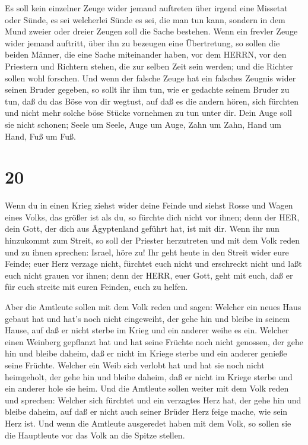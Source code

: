  Es soll kein einzelner Zeuge wider jemand auftreten über
irgend eine Missetat oder Sünde, es sei welcherlei Sünde es sei, die man
tun kann, sondern in dem Mund zweier oder dreier Zeugen soll die Sache
bestehen.  Wenn ein frevler Zeuge wider jemand auftritt,
über ihn zu bezeugen eine Übertretung,  so sollen die
beiden Männer, die eine Sache miteinander haben, vor dem HERRN, vor den
Priestern und Richtern stehen, die zur selben Zeit sein werden;
 und die Richter sollen wohl forschen. Und wenn der falsche
Zeuge hat ein falsches Zeugnis wider seinen Bruder gegeben,
 so sollt ihr ihm tun, wie er gedachte seinem Bruder zu
tun, daß du das Böse von dir wegtust,  auf daß es die
andern hören, sich fürchten und nicht mehr solche böse Stücke vornehmen
zu tun unter dir.  Dein Auge soll sie nicht schonen; Seele
um Seele, Auge um Auge, Zahn um Zahn, Hand um Hand, Fuß um Fuß.

\hypertarget{section-19}{%
\section{20}\label{section-19}}

 Wenn du in einen Krieg ziehst wider deine Feinde und siehst
Rosse und Wagen eines Volks, das größer ist als du, so fürchte dich
nicht vor ihnen; denn der HER, dein Gott, der dich aus Ägyptenland
geführt hat, ist mit dir.  Wenn ihr nun hinzukommt zum
Streit, so soll der Priester herzutreten und mit dem Volk reden
 und zu ihnen sprechen: Israel, höre zu! Ihr geht heute in
den Streit wider eure Feinde; euer Herz verzage nicht, fürchtet euch
nicht und erschreckt nicht und laßt euch nicht grauen vor ihnen;
 denn der HERR, euer Gott, geht mit euch, daß er für euch
streite mit euren Feinden, euch zu helfen.

 Aber die Amtleute sollen mit dem Volk reden und sagen:
Welcher ein neues Haus gebaut hat und hat's noch nicht eingeweiht, der
gehe hin und bleibe in seinem Hause, auf daß er nicht sterbe im Krieg
und ein anderer weihe es ein.  Welcher einen Weinberg
gepflanzt hat und hat seine Früchte noch nicht genossen, der gehe hin
und bleibe daheim, daß er nicht im Kriege sterbe und ein anderer genieße
seine Früchte.  Welcher ein Weib sich verlobt hat und hat
sie noch nicht heimgeholt, der gehe hin und bleibe daheim, daß er nicht
im Kriege sterbe und ein anderer hole sie heim.  Und die
Amtleute sollen weiter mit dem Volk reden und sprechen: Welcher sich
fürchtet und ein verzagtes Herz hat, der gehe hin und bleibe daheim, auf
daß er nicht auch seiner Brüder Herz feige mache, wie sein Herz ist.
 Und wenn die Amtleute ausgeredet haben mit dem Volk, so
sollen sie die Hauptleute vor das Volk an die Spitze stellen.

